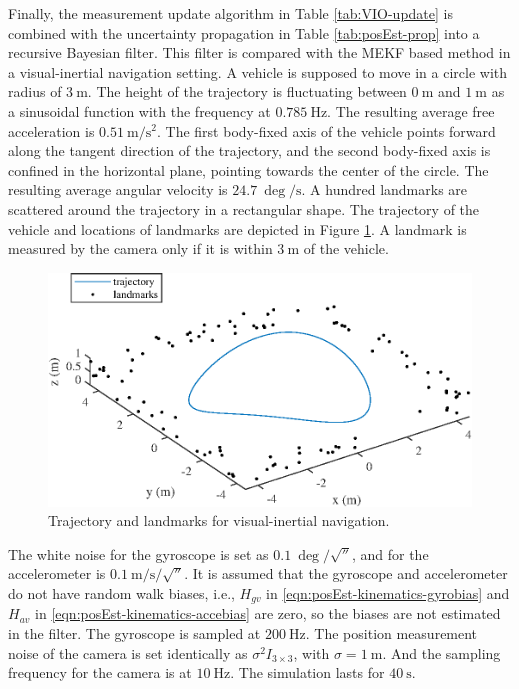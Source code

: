 Finally, the measurement update algorithm in Table \ref{tab:VIO-update} is combined with the uncertainty propagation in Table \ref{tab:posEst-prop} into a recursive Bayesian filter.
This filter is compared with the MEKF based method in a visual-inertial navigation setting.
A vehicle is supposed to move in a circle with radius of $\SI{3}{\meter}$.
The height of the trajectory is fluctuating between $\SI{0}{\meter}$ and $\SI{1}{\meter}$ as a sinusoidal function with the frequency at $\SI{0.785}{\hertz}$.
The resulting average free acceleration is $\SI{0.51}{\meter/\second\squared}$.
The first body-fixed axis of the vehicle points forward along the tangent direction of the trajectory, and the second body-fixed axis is confined in the horizontal plane, pointing towards the center of the circle.
The resulting average angular velocity is $\SI{24.7}{\deg/\second}$.
A hundred landmarks are scattered around the trajectory in a rectangular shape.
The trajectory of the vehicle and locations of landmarks are depicted in Figure \ref{fig:VIO-trajectory}.
A landmark is measured by the camera only if it is within $\SI{3}{\meter}$ of the vehicle.

\begin{figure}
	\centering
	\includegraphics{figures/VIO-trajectory}
	\caption{Trajectory and landmarks for visual-inertial navigation.}
	\label{fig:VIO-trajectory}
\end{figure}

The white noise for the gyroscope is set as $\SI{0.1}{\deg/\sqrt{\second}}$, and for the accelerometer is $\SI{0.1}{\meter/\second/\sqrt{\second}}$.
It is assumed that the gyroscope and accelerometer do not have random walk biases, i.e., $H_{gv}$ in \eqref{eqn:posEst-kinematics-gyrobias} and $H_{av}$ in \eqref{eqn:posEst-kinematics-accebias} are zero, so the biases are not estimated in the filter.
The gyroscope is sampled at $\SI{200}{\hertz}$.
The position measurement noise of the camera is set identically as $\sigma^2I_{3\times 3}$, with $\sigma = \SI{1}{\meter}$.
And the sampling frequency for the camera is at $\SI{10}{\hertz}$.
The simulation lasts for $\SI{40}{\second}$.

